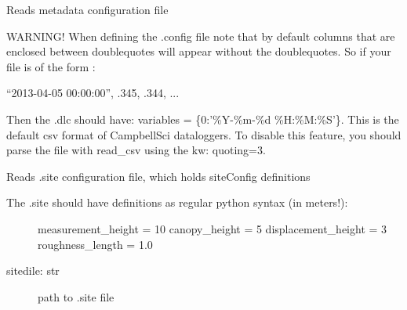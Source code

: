 \documentclass[a4paper,10pt,oneside]{sphinxmanual}
\begin{document}

\begin{fulllineitems}
\label{pymicra:pymicra.io.read_fileConfig}
Reads metadata configuration file

WARNING! When defining the .config file note that by default columns that are enclosed between doublequotes
will appear without the doublequotes. So if your file is of the form :

``2013-04-05 00:00:00'', .345, .344, ...

Then the .dlc should have: variables = \{0:'\%Y-\%m-\%d \%H:\%M:\%S'\}. This is the default csv format of
CampbellSci dataloggers. To disable this feature, you should parse the file with read\_csv using the kw: quoting=3.

\end{fulllineitems}


\begin{fulllineitems}
\label{pymicra:pymicra.io.read_site}
Reads .site configuration file, which holds siteConfig definitions
\begin{description}
\item[{The .site should have definitions as regular python syntax (in meters!):}] \leavevmode
measurement\_height  = 10
canopy\_height       = 5
displacement\_height = 3
roughness\_length    = 1.0

\item[{sitedile: str}] \leavevmode
path to .site file

\end{description}

\end{fulllineitems}

\end{document}
